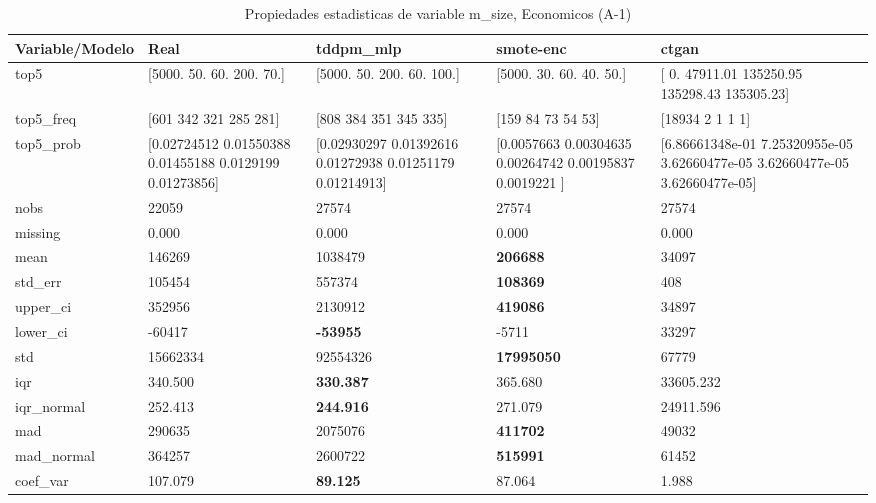 \begin{table}[H]
\centering
\fontsize{8}{14}\selectfont
\caption{Propiedades  estadisticas de variable m\_size, Economicos (A-1)}
\label{table-stats-economicos-a-1-m_size}
\begin{tabular}{|l|m{10em}|m{10em}|m{10em}|m{10em}|}
\hline
 \rowcolor[gray]{0.8}
Variable/Modelo & Real & tddpm\_mlp & smote-enc & ctgan \\
\hline top5 & [5000.   50.   60.  200.   70.] & [5000.   50.  200.   60.  100.] & [5000.   30.   60.   40.   50.] & [     0.    47911.01 135250.95 135298.43 135305.23] \\
\hline top5\_freq & [601 342 321 285 281] & [808 384 351 345 335] & [159  84  73  54  53] & [18934     2     1     1     1] \\
\hline top5\_prob & [0.02724512 0.01550388 0.01455188 0.0129199  0.01273856] & [0.02930297 0.01392616 0.01272938 0.01251179 0.01214913] & [0.0057663  0.00304635 0.00264742 0.00195837 0.0019221 ] & [6.86661348e-01 7.25320955e-05 3.62660477e-05 3.62660477e-05
 3.62660477e-05] \\
\hline nobs & 22059 & 27574 & 27574 & 27574 \\
\hline missing & 0.000 & 0.000 & 0.000 & 0.000 \\
\hline mean & 146269 & \cellcolor[rgb]{0.9, 0.54, 0.52} 1038479 & \bfseries 206688 & 34097 \\
\hline std\_err & 105454 & \cellcolor[rgb]{0.9, 0.54, 0.52} 557374 & \bfseries 108369 & 408 \\
\hline upper\_ci & 352956 & \cellcolor[rgb]{0.9, 0.54, 0.52} 2130912 & \bfseries 419086 & 34897 \\
\hline lower\_ci & -60417 & \bfseries -53955 & -5711 & \cellcolor[rgb]{0.9, 0.54, 0.52} 33297 \\
\hline std & 15662334 & \cellcolor[rgb]{0.9, 0.54, 0.52} 92554326 & \bfseries 17995050 & 67779 \\
\hline iqr & 340.500 & \bfseries 330.387 & 365.680 & \cellcolor[rgb]{0.9, 0.54, 0.52} 33605.232 \\
\hline iqr\_normal & 252.413 & \bfseries 244.916 & 271.079 & \cellcolor[rgb]{0.9, 0.54, 0.52} 24911.596 \\
\hline mad & 290635 & \cellcolor[rgb]{0.9, 0.54, 0.52} 2075076 & \bfseries 411702 & 49032 \\
\hline mad\_normal & 364257 & \cellcolor[rgb]{0.9, 0.54, 0.52} 2600722 & \bfseries 515991 & 61452 \\
\hline coef\_var & 107.079 & \bfseries 89.125 & 87.064 & \cellcolor[rgb]{0.9, 0.54, 0.52} 1.988 \\

\end{tabular}
\end{table}

